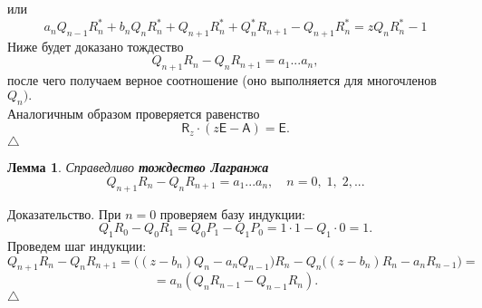 \documentclass[12 pt, a4 paper]{article}
\theoremstyle{plain}   \newtheorem{Pro}{Задача}
\newtheorem{Lem}{Лемма}
\begin{document}
или
$$
  a_n Q_{n-1} R_n ^{\ast} +
  b_n Q_n R_n ^{\ast} +
  Q_{n+1} R_n ^{\ast} +
  Q_n ^{\ast} R_{n+1} -
  Q_{n+1} R_n ^{\ast} =
  z Q_n R_n ^{\ast} -1
$$
Ниже будет доказано тождество
$$
  Q_{n+1} R_n - Q_n R_{n+1} =a_1 ...a_n ,
$$
после чего получаем верное соотношение (оно выполняется для
многочленов
$ Q_n ). $
\\
Аналогичным образом проверяется равенство
$$
  \mathsf{R}_z \cdot
  (z \mathsf{E} - \mathsf{A} )= \mathsf{E} .
$$
$ \triangle $
\begin{Lem}
Справедливо
{\bfseries тождество Лагранжа}
$$
  Q_{n+1} R_n -Q_n R_{n+1} =
  a_1 ...a_n , \quad n=0, \; 1, \; 2,...
$$
\end{Lem}
{\Large Доказательство.}
При
$ n=0 $
проверяем базу индукции:
$$
  Q_1 R_0 -Q_0 R_1 = Q_0 P_1 -Q_1 P_0 =1 \cdot 1 -
  Q_1 \cdot 0 =1.
$$
Проведем шаг индукции:
$$
  Q_{n+1} R_n -Q_n R_{n+1} =
  \bigl ( (z-b_n )Q_n -a_n Q_{n-1} \bigr ) R_n -
  Q_n \bigl ( (z-b_n )R_n -a_n R_{n-1} \bigr ) =
$$
$$
  =a_n ( Q_n R_{n-1} - Q_{n-1} R_n ) .
$$
$ \triangle $
\newpage
\end{document}
